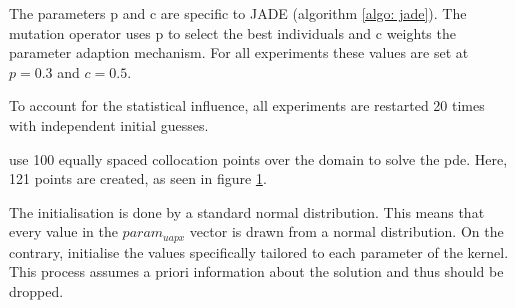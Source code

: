 \documentclass[./\jobname.tex]{subfiles}
\begin{document}
The parameters p and c are specific to JADE (algorithm \ref{algo: jade}). The mutation operator  uses p to select the best individuals and c weights the parameter adaption mechanism. For all experiments these values are set at $p=0.3$ and $c=0.5$. 

To account for the statistical influence, all experiments are restarted 20 times with independent initial guesses. 

\cite{chaquet_using_2019} use 100 equally spaced collocation points over the domain to solve the \gls{pde}. Here, 121 points are created, as seen in figure \ref{fig:collocation_points}. 


\begin{figure}[h]
	\centering
	\noindent{}
	\label{fig:collocation_points}
\end{figure}

The initialisation is done by a standard normal distribution. This means that every value in the $param_{uapx}$ vector is drawn from a normal distribution. On the contrary, \cite{chaquet_using_2019} initialise the values specifically tailored to each parameter of the kernel. This process assumes a priori information about the solution and thus should be dropped. 
\end{document}
